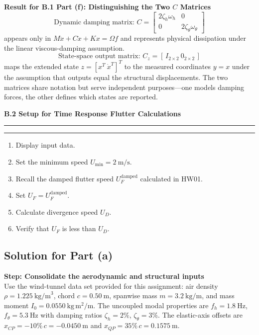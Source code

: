 \documentclass[12pt]{article}
\newcommand{\question}[1]{%
  \clearpage
  \vspace{0.5cm}
  {\noindent\normalsize \textbf{#1}}%
  \vspace{0.2cm}
  \hrule
  \vspace{0.1cm}
  \hrule
  \vspace{0.3cm}
}
\begin{document}
\begin{resultsbox}
\textbf{Result for B.1 Part (f): Distinguishing the Two $C$ Matrices}\\[0.5em]
\[
\text{Dynamic damping matrix: } C = \begin{bmatrix} 2\zeta_h\omega_h & 0 \\[0.2em] 0 & 2\zeta_\theta\omega_\theta \end{bmatrix}
\]
appears only in $M\ddot{x}+C\dot{x}+Kx=\Omega f$ and represents physical dissipation under the linear viscous-damping assumption.
\[
\text{State-space output matrix: } C_z = [\,I_{2\times2} \ 0_{2\times2}\,]
\]
maps the extended state $z=[x^T \ \dot{x}^T]^T$ to the measured coordinates $y=x$ under the assumption that outputs equal the structural displacements.  The two matrices share notation but serve independent purposes—one models damping forces, the other defines which states are reported.
\end{resultsbox}

\question{B.2 Setup for Time Response Flutter Calculations}\label{quest:B2}

\begin{enumerate}[label=(\alph*)]
  \item Display input data.
  \item Set the minimum speed $U_{\min} = 2~\mathrm{m/s}$.
  \item Recall the damped flutter speed $U_F^{\text{damped}}$ calculated in HW01.
  \item Set $U_F = U_F^{\text{damped}}$.
  \item Calculate divergence speed $U_D$.
  \item Verify that $U_F$ is less than $U_D$.
\end{enumerate}
\subsection*{Solution for Part (a)}

\begin{stepbox}
\textbf{Step: Consolidate the aerodynamic and structural inputs}\\[0.5em]
Use the wind-tunnel data set provided for this assignment: air density $\rho = 1.225~\text{kg/m}^3$, chord $c = 0.50~\text{m}$, spanwise mass $m = 3.2~\text{kg/m}$, and mass moment $I_0 = 0.0550~\text{kg}\,\text{m}^2/\text{m}$.  The uncoupled modal properties are $f_h = 1.8~\text{Hz}$, $f_\theta = 5.3~\text{Hz}$ with damping ratios $\zeta_h = 2\%$, $\zeta_\theta = 3\%$.  The elastic-axis offsets are $x_{CP} = -10\%\,c = -0.0450~\text{m}$ and $x_{QP} = 35\%\,c = 0.1575~\text{m}$.
\end{stepbox}
\end{document}
